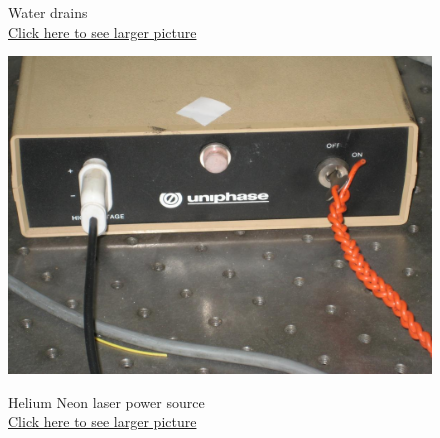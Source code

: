 \documentclass{../lab}
\begin{document}
\begin{figure}[H]
  \caption{Water drains \\
  \href{http://experimentationlab.berkeley.edu/sites/default/files/images/Water_Drains_3531.jpg}{Click here to see larger picture}}
  \label{fig:WaterDrains}
\endminipage\hfill
{}
  \href{http://experimentationlab.berkeley.edu/sites/default/files/images/HeNepower.jpg}{\includegraphics[width=\linewidth,keepaspectratio]{images/HeNepower.jpg}}
  \caption{Helium Neon laser power source \\ \href{http://experimentationlab.berkeley.edu/sites/default/files/images/HeNepower.jpg}{Click here to see larger picture}}\label{fig:HeNePower}
\endminipage
\end{figure}
\end{document}

